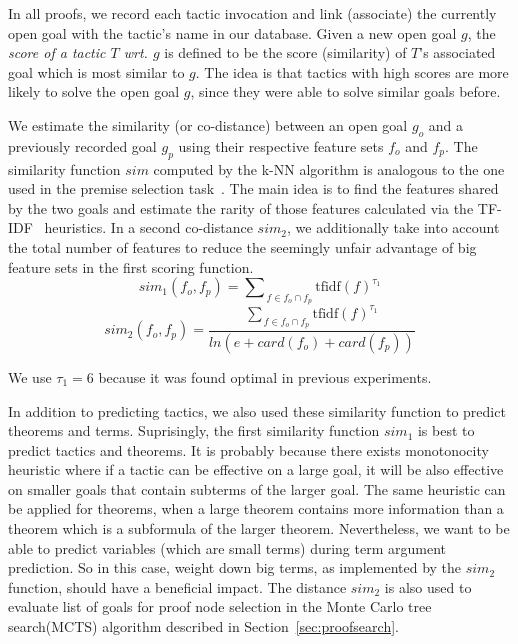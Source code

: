 \documentclass[runningheads,a4paper,draft]{svjour3}
\begin{document}
In all proofs, we record each tactic invocation and link (associate) the 
currently open goal with the tactic's name in our database.
Given a new open goal $g$, the \emph{score of a tactic $T$ wrt. $g$} is defined 
to be the score (similarity) of $T$'s 
associated goal which is most similar to $g$.
The idea is that tactics with high scores are more likely to solve the open 
goal $g$, 
since they were able to solve similar goals before.

We estimate the similarity (or co-distance) between an open goal $g_o$ and a 
previously recorded goal $g_p$ using their respective feature sets $f_o$ and 
$f_p$.
The similarity function $sim$ computed by the k-NN algorithm is analogous 
to the
one used in the premise selection task~\cite{ckju-pxtp13}. The main idea 
is to find the features shared by the two goals and estimate the rarity of 
those features calculated via the TF-IDF~\cite{Jones72astatistical} heuristics.
In a second co-distance $sim_2$, we additionally take into account 
the
total number of 
features to reduce the seemingly unfair advantage of big feature sets in the 
first scoring function.
\[sim_1 (f_o, f_p) = {\sum\nolimits_{\,f \in f_o \cap 
f_p}{\text{tfidf}(f)^{\tau_1}}}\]
\[sim_2 (f_o, f_p) = \frac{{\sum\nolimits_{\,f \in f_o \cap 
f_p}{\text{tfidf}(f)^{\tau_1}}}}
{ln (e + card(f_o) + card(f_p))}
\]

\begin{remark}
We use $\tau_1 = 6$ because it was found optimal in previous experiments.
\end{remark}



In addition to predicting tactics, we also used these similarity function to 
predict theorems and terms. Suprisingly, the first similarity function $sim_1$
is best to predict tactics and theorems. It is probably because there exists 
monotonocity heuristic where if a tactic can be effective on a large goal, it 
will be also effective on smaller goals that contain subterms of the larger 
goal. The same heuristic can be applied for theorems, when a large theorem 
contains more information than a theorem which is a subformula of the larger 
theorem. Nevertheless, we want to be able to predict variables (which are small 
terms) during term argument prediction. So in this case, weight down big terms, 
as implemented by the $sim_2$ function, should have a beneficial impact.
The distance $sim_2$ is also used to evaluate list of goals for proof node 
selection in the Monte Carlo tree search(MCTS) algorithm described in 
Section~\ref{sec:proofsearch}.
\end{document}
